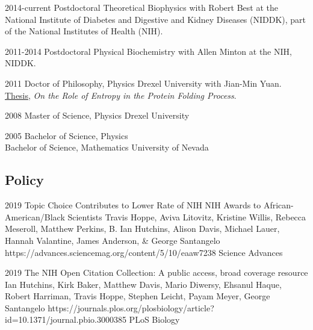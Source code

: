\documentclass[]{scrartcl}
\begin{document}
\begin{cleanCV}


\WorkExperience
{2014-current}
{Postdoctoral}
{
Theoretical Biophysics with Robert Best at the
National Institute of Diabetes and Digestive and Kidney Diseases (NIDDK), 
part of the National Institutes of Health (NIH).
}

\WorkExperience
{2011-2014}
{Postdoctoral}
{
Physical Biochemistry with Allen Minton at the NIH, NIDDK.
}


\WorkExperience
{2011}
{Doctor of Philosophy, Physics}
{
Drexel University with Jian-Min Yuan. 
\href{https://idea.library.drexel.edu/islandora/object/idea:3488}{Thesis},
\emph{On the Role of Entropy in the Protein Folding Process}.
}

\WorkExperience
{2008}
{Master of Science, Physics}
{Drexel University}

\WorkExperience
{2005}
{Bachelor of Science, Physics\\
Bachelor of Science, Mathematics}
{University of Nevada}

%
%


\subsection{Policy}

\Paper
{2019}
{Topic Choice Contributes to Lower Rate of NIH NIH Awards to African-American/Black Scientists}
{Travis Hoppe, Aviva Litovitz, Kristine Willis, Rebecca Meseroll, Matthew Perkins, B. Ian Hutchins, Alison Davis, Michael Lauer, Hannah Valantine, James Anderson, \& George Santangelo}
{https://advances.sciencemag.org/content/5/10/eaaw7238}
{Science Advances}

\Paper
{2019}
{The NIH Open Citation Collection: A public access, broad coverage resource}
{Ian Hutchins, Kirk Baker, Matthew Davis, Mario Diwersy, Ehsanul Haque, Robert Harriman, Travis Hoppe, Stephen Leicht, Payam Meyer, George Santangelo}
{https://journals.plos.org/plosbiology/article?id=10.1371/journal.pbio.3000385}
{PLoS Biology}



\end{cleanCV}
\end{document}
